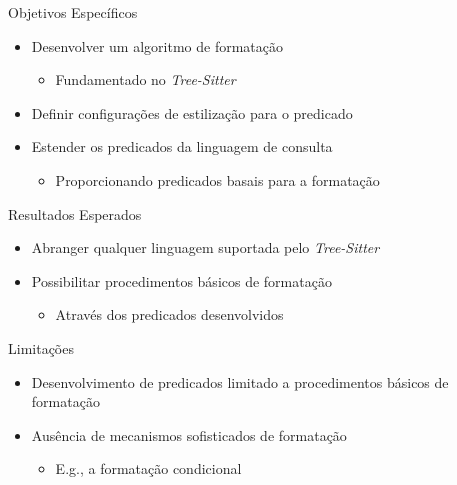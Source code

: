 \documentclass
  [ aspectratio=169,
    english,
    hyperref={citecolor=blue,colorlinks=true,linkcolor=blue,urlcolor=blue},
    brazil]
  {beamer}
\newcommand{\treesitter}{\textit{Tree-Sitter}\xspace}
\begin{document}
  \begin{frame}[fragile]{Objetivos Específicos}
    \begin{itemize}
      \item Desenvolver um algoritmo de formatação
            \begin{itemize}
              \item Fundamentado no \treesitter
            \end{itemize}
      \item Definir configurações de estilização para o predicado
      \item Estender os predicados da linguagem de consulta
            \begin{itemize}
              \item Proporcionando predicados basais para a formatação
            \end{itemize}
    \end{itemize}
  \end{frame}


  \begin{frame}{Resultados Esperados}
    \begin{itemize}
      \item Abranger qualquer linguagem suportada pelo \treesitter
      \item Possibilitar procedimentos básicos de formatação
            \begin{itemize}
              \item Através dos predicados desenvolvidos
            \end{itemize}
    \end{itemize}
  \end{frame}


  \begin{frame}{Limitações}
    \begin{itemize}
      \item Desenvolvimento de predicados limitado a procedimentos básicos de
            formatação
      \item Ausência de mecanismos sofisticados de formatação
            \begin{itemize}
              \item E.g., a formatação condicional
            \end{itemize}
    \end{itemize}
  \end{frame}
\end{document}
